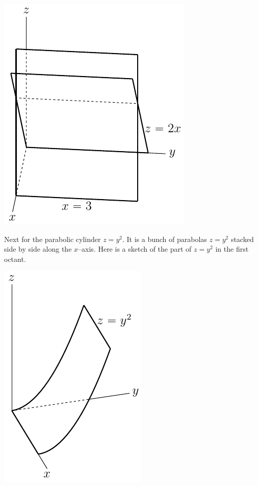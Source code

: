 \begin{solution}
\begin{center}
\includegraphics[scale=0.7]{fig/OE14D_9c.pdf}
\end{center} 

Next for the parabolic cylinder $z=y^2$. 
It is a bunch of parabolas $z=y^2$ stacked side by side along the $x$--axis. Here is a sketch of the part of  $z=y^2$ in the first octant.

\begin{center}
\includegraphics[scale=0.7]{fig/OE14D_9d.pdf}
\end{center} 


\end{solution}
